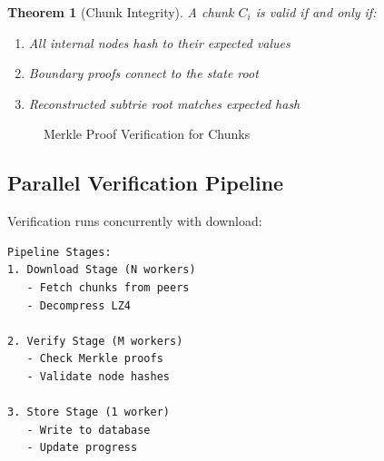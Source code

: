 \documentclass[11pt,a4paper]{article}
\newtheorem{theorem}{Theorem}
\begin{document}
\begin{theorem}[Chunk Integrity]
A chunk $C_i$ is valid if and only if:
\begin{enumerate}
    \item All internal nodes hash to their expected values
    \item Boundary proofs connect to the state root
    \item Reconstructed subtrie root matches expected hash
\end{enumerate}
\end{theorem}

\begin{figure}[htbp]
\centering
{}
\caption{Merkle Proof Verification for Chunks}
\label{fig:merkle}
\end{figure}

\subsection{Parallel Verification Pipeline}

Verification runs concurrently with download:

\begin{lstlisting}
Pipeline Stages:
1. Download Stage (N workers)
   - Fetch chunks from peers
   - Decompress LZ4

2. Verify Stage (M workers)
   - Check Merkle proofs
   - Validate node hashes

3. Store Stage (1 worker)
   - Write to database
   - Update progress
\end{lstlisting}
\end{document}
